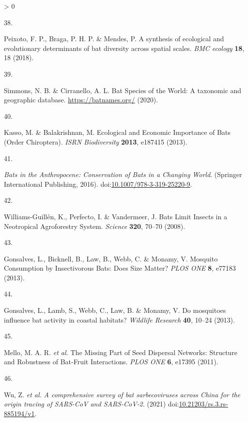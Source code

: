 \documentclass[11pt]{article}
\newlength{\cslhangindent}
\newlength{\csllabelwidth}
\newenvironment{CSLReferences}[3] %
 {%
  \setlength{\parindent}{0pt}
  \ifodd #1 \everypar{\setlength{\hangindent}{\cslhangindent}}\ignorespaces\fi
  \ifnum #2 > 0
  \setlength{\parskip}{#2\baselineskip}
  \fi
 }%
 {}
\newcommand{\CSLLeftMargin}[1]{\parbox[t]{\maxof{\widthof{#1}}{\csllabelwidth}}{#1}}
\newcommand{\CSLRightInline}[1]{\parbox[t]{\linewidth}{#1}}
\begin{document}
\begin{CSLReferences}{0}{0}
\leavevmode\hypertarget{ref-Peixoto2018SynEco}{}%
\CSLLeftMargin{38. }
\CSLRightInline{Peixoto, F. P., Braga, P. H. P. \& Mendes, P. A
synthesis of ecological and evolutionary determinants of bat diversity
across spatial scales. \emph{BMC ecology} \textbf{18}, 18 (2018).}

\leavevmode\hypertarget{ref-Simmons2020BatSpe}{}%
\CSLLeftMargin{39. }
\CSLRightInline{Simmons, N. B. \& Cirranello, A. L. Bat Species of the
World: A taxonomic and geographic database. \url{https://batnames.org/}
(2020).}

\leavevmode\hypertarget{ref-Kasso2013EcoEco}{}%
\CSLLeftMargin{40. }
\CSLRightInline{Kasso, M. \& Balakrishnan, M. Ecological and Economic
Importance of Bats (Order Chiroptera). \emph{ISRN Biodiversity}
\textbf{2013}, e187415 (2013).}

\leavevmode\hypertarget{ref-Voigt2016BatAnt}{}%
\CSLLeftMargin{41. }
\CSLRightInline{\emph{Bats in the Anthropocene: Conservation of Bats in
a Changing World}. (Springer International Publishing, 2016).
doi:\href{https://doi.org/10.1007/978-3-319-25220-9}{10.1007/978-3-319-25220-9}.}

\leavevmode\hypertarget{ref-Williams-Guillen2008BatLim}{}%
\CSLLeftMargin{42. }
\CSLRightInline{Williams-Guillén, K., Perfecto, I. \& Vandermeer, J.
Bats Limit Insects in a Neotropical Agroforestry System. \emph{Science}
\textbf{320}, 70--70 (2008).}

\leavevmode\hypertarget{ref-Gonsalves2013MosCon}{}%
\CSLLeftMargin{43. }
\CSLRightInline{Gonsalves, L., Bicknell, B., Law, B., Webb, C. \&
Monamy, V. Mosquito Consumption by Insectivorous Bats: Does Size Matter?
\emph{PLOS ONE} \textbf{8}, e77183 (2013).}

\leavevmode\hypertarget{ref-Gonsalves2013MosInf}{}%
\CSLLeftMargin{44. }
\CSLRightInline{Gonsalves, L., Lamb, S., Webb, C., Law, B. \& Monamy, V.
Do mosquitoes influence bat activity in coastal habitats? \emph{Wildlife
Research} \textbf{40}, 10--24 (2013).}

\leavevmode\hypertarget{ref-Mello2011MisPar}{}%
\CSLLeftMargin{45. }
\CSLRightInline{Mello, M. A. R. \emph{et al.} The Missing Part of Seed
Dispersal Networks: Structure and Robustness of Bat-Fruit Interactions.
\emph{PLOS ONE} \textbf{6}, e17395 (2011).}

\leavevmode\hypertarget{ref-Wu2021ComSur}{}%
\CSLLeftMargin{46. }
\CSLRightInline{Wu, Z. \emph{et al.} \emph{A comprehensive survey of bat
sarbecoviruses across China for the origin tracing of SARS-CoV and
SARS-CoV-2}. (2021)
doi:\href{https://doi.org/10.21203/rs.3.rs-885194/v1}{10.21203/rs.3.rs-885194/v1}.}


\end{CSLReferences}
\end{document}
